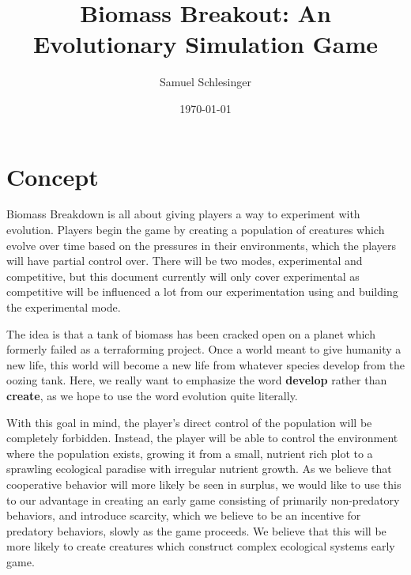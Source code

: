 \documentclass{article}
\title{Biomass Breakout: An Evolutionary Simulation Game}
\author{Samuel Schlesinger}
\date{\today}
\begin{document}
\maketitle

\section*{Concept}

Biomass Breakdown is all about giving players a way to experiment with
evolution. Players begin the game by creating a population of creatures which
evolve over time based on the pressures in their environments, which the
players will have partial control over. There will be two modes, experimental
and competitive, but this document currently will only cover experimental
as competitive will be influenced a lot from our experimentation using and
building the experimental mode.

The idea is that a tank of biomass has been cracked open on a planet which
formerly failed as a terraforming project. Once a world meant to give humanity
a new life, this world will become a new life from whatever species develop
from the oozing tank. Here, we really want to emphasize the word
\textbf{develop} rather than \textbf{create}, as we hope to use the word
evolution quite literally.

With this goal in mind, the player's direct control of the population will be
completely forbidden. Instead, the player will be able to control the
environment where the population exists, growing it from a small, nutrient rich
plot to a sprawling ecological paradise with irregular nutrient growth. As we
believe that cooperative behavior will more likely be seen in surplus, we would like
to use this to our advantage in creating an early game consisting of primarily
non-predatory behaviors, and introduce scarcity, which we believe to be an incentive
for predatory behaviors, slowly as the game proceeds. We believe that this
will be more likely to create creatures which construct complex ecological systems
early game.
\end{document}
